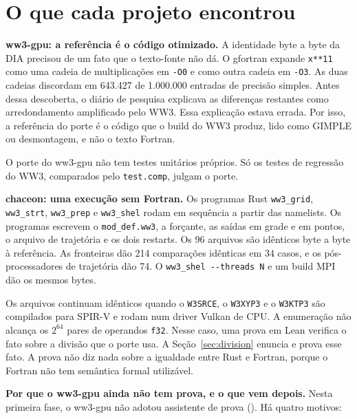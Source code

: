 \documentclass[10pt,a4paper,]{article}
\begin{document}
\section{O que cada projeto encontrou}\label{sec:found}

\textbf{ww3-gpu: a referência é o código otimizado.} A identidade byte a
byte da DIA precisou de um fato que o texto-fonte não dá. O gfortran
expande \texttt{x**11} como uma cadeia de multiplicações em \texttt{-O0}
e como outra cadeia em \texttt{-O3}. As duas cadeias discordam em
643.427 de 1.000.000 entradas de precisão simples. Antes dessa
descoberta, o diário de pesquisa explicava as diferenças restantes como
arredondamento amplificado pelo WW3. Essa explicação estava errada. Por
isso, a referência do porte é o código que o build do WW3 produz, lido
como GIMPLE ou desmontagem, e não o texto Fortran.

O porte do ww3-gpu não tem testes unitários próprios. Só os testes de
regressão do WW3, comparados pelo \texttt{test.comp}, julgam o porte.

\textbf{chaceon: uma execução sem Fortran.} Os programas Rust
\texttt{ww3\_grid}, \texttt{ww3\_strt}, \texttt{ww3\_prep} e
\texttt{ww3\_shel} rodam em sequência a partir das namelists. Os
programas escrevem o \texttt{mod\_def.ww3}, a forçante, as saídas em
grade e em pontos, o arquivo de trajetória e os dois restarts. Os 96
arquivos são idênticos byte a byte à referência. As fronteiras dão 214
comparações idênticas em 34 casos, e os pós-processadores de trajetória
dão 74. O \texttt{ww3\_shel\ -\/-threads\ N} e um build MPI dão os
mesmos bytes.

Os arquivos continuam idênticos quando o \texttt{W3SRCE}, o
\texttt{W3XYP3} e o \texttt{W3KTP3} são compilados para SPIR-V e rodam
num driver Vulkan de CPU. A enumeração não alcança os \(2^{64}\) pares
de operandos \texttt{f32}. Nesse caso, uma prova em Lean verifica o fato
sobre a divisão que o porte usa. A Seção~\ref{sec:division} enuncia e
prova esse fato. A prova não diz nada sobre a igualdade entre Rust e
Fortran, porque o Fortran não tem semântica formal utilizável.

\textbf{Por que o ww3-gpu ainda não tem prova, e o que vem depois.}
Nesta primeira fase, o ww3-gpu não adotou assistente de prova
(). Há quatro motivos:
\end{document}

